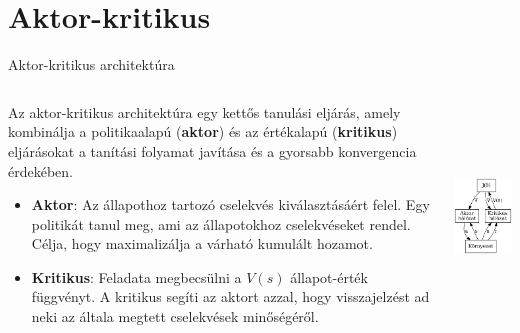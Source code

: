 \documentclass[english, aspectratio=169]{beamer}
\makeatletter
\let\origtableofcontents=\tableofcontents
\def\tableofcontents{\@ifnextchar[{\origtableofcontents}{\gobbletableofcontents}}
\def\gobbletableofcontents#1{\origtableofcontents}
\makeatother
\begin{document}
\section{Aktor-kritikus}

\begin{frame}
\tableofcontents[currentsection]
\end{frame}

\begin{frame}{Aktor-kritikus architektúra}
\begin{columns}
\begin{column}{.6\textwidth}
Az aktor-kritikus architektúra egy kettős tanulási eljárás, amely kombinálja a politikaalapú (\textbf{aktor}) és az értékalapú (\textbf{kritikus}) eljárásokat a tanítási folyamat javítása és a gyorsabb konvergencia érdekében.\par\smallskip
\begin{itemize}
	\item \textbf{Aktor}: Az állapothoz tartozó cselekvés kiválasztásáért felel. Egy politikát tanul meg, ami az állapotokhoz cselekvéseket rendel. Célja, hogy maximalizálja a várható kumulált hozamot. 
	\item \textbf{Kritikus}: Feladata megbecsülni a $V(s)$ állapot-érték függvényt. A kritikus segíti az aktort azzal, hogy visszajelzést ad neki az általa megtett cselekvések minőségéről. 
\end{itemize}
\end{column}
\begin{column}{.4\textwidth}
\begin{center}
\includegraphics[height=6cm, keepaspectratio]{graphs/dql_7.png}
\end{center}
\end{column}
\end{columns}
\end{frame}
\end{document}
